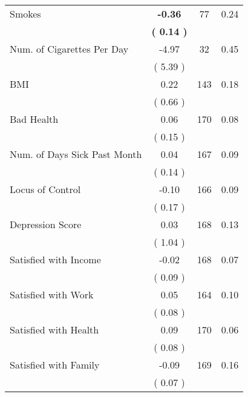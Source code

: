 \begin{tabular}{lccc}
Smokes & \textbf{    -0.36} & 77 &      0.24 \\ 
 & \textbf{(     0.14 )} & \\
Num. of Cigarettes Per Day &     -4.97 & 32 &      0.45 \\ 
 & (     5.39 ) & \\
BMI &      0.22 & 143 &      0.18 \\ 
 & (     0.66 ) & \\
Bad Health &      0.06 & 170 &      0.08 \\ 
 & (     0.15 ) & \\
Num. of Days Sick Past Month &      0.04 & 167 &      0.09 \\ 
 & (     0.14 ) & \\
Locus of Control &     -0.10 & 166 &      0.09 \\ 
 & (     0.17 ) & \\
Depression Score &      0.03 & 168 &      0.13 \\ 
 & (     1.04 ) & \\
Satisfied with Income &     -0.02 & 168 &      0.07 \\ 
 & (     0.09 ) & \\
Satisfied with Work &      0.05 & 164 &      0.10 \\ 
 & (     0.08 ) & \\
Satisfied with Health &      0.09 & 170 &      0.06 \\ 
 & (     0.08 ) & \\
Satisfied with Family &     -0.09 & 169 &      0.16 \\ 
 & (     0.07 ) & \\
\bottomrule
\end{tabular}
